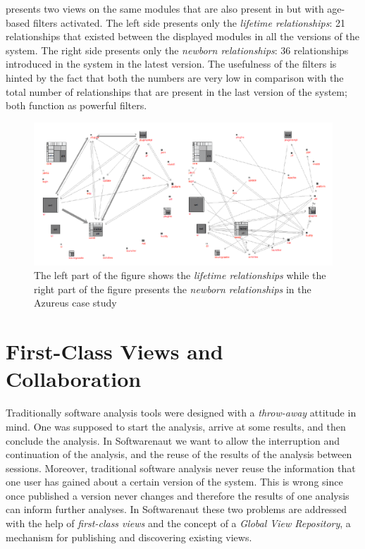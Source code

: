 \documentclass[preprint,12pt]{elsarticle}
\begin{document}
 presents two views on the same modules that are also present in  but with age-based filters activated. 
The left side presents only the {\em lifetime relationships}: 21 relationships that existed between the displayed modules in all the versions of the system. The right side presents only the {\em newborn relationships}: 36 relationships introduced in the system in the latest version. The usefulness of the filters is hinted by the fact that both the numbers are very low in comparison with the total number of relationships that are present in the last version of the system; both function as powerful filters.

\begin{figure}
\begin{center}
\includegraphics[width=\linewidth]{Architecture-LifetimeVsRecent}
\caption{The left part of the figure shows the {\em lifetime relationships} while the right part of the figure presents the {\em newborn relationships} in the Azureus case study}
\end{center}
\end{figure}



\newpage
\section {First-Class Views and Collaboration}


Traditionally software analysis tools were designed with a {\em throw-away} attitude  in mind. One was supposed to start the analysis, arrive at some results, and then conclude the analysis. In Softwarenaut we want to allow the interruption and continuation of the analysis, and the reuse of the results of the analysis between sessions. Moreover, traditional software analysis never reuse the information that one user has gained about a certain version of the system. This is wrong since once published a version never changes and therefore the results of one analysis can inform further analyses. 
In Softwarenaut these two problems are addressed with the help of {\em first-class views} and the concept of a {\em Global View Repository}, a mechanism for publishing and discovering existing views.
\end{document}
